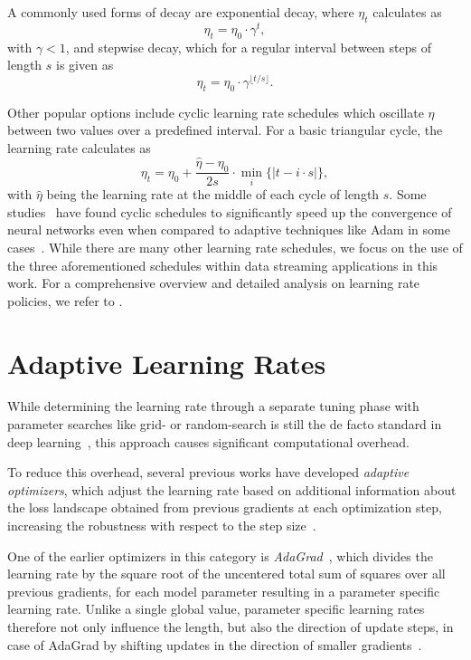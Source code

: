\documentclass[letterpaper]{article} %
\begin{document}
A commonly used forms of decay are exponential decay, where $\eta_{t}$ calculates as
\begin{equation}
	\eta_{t} = \eta_0 \cdot \gamma^t,
\end{equation}
with $\gamma < 1$, and stepwise decay, which for a regular interval between steps of length $s$ is given as
\begin{equation}
	\eta_{t} = \eta_0 \cdot \gamma^{\lfloor t/s \rfloor}.
\end{equation}

Other popular options include cyclic learning rate schedules which oscillate $\eta$ between two values over a predefined interval.
For a basic triangular cycle, the learning rate calculates as
\begin{equation}
	\eta_t = \eta_0 + \frac{\hat{\eta} - \eta_0}{2s} \cdot \min_{i} \{|t-i\cdot s|\},
\end{equation}
with $\hat{\eta}$ being the learning rate at the middle of each cycle of length $s$.
Some studies~\cite{smithCyclicalLearningRates2017, smithSuperConvergenceVeryFast2018a} have found cyclic schedules to significantly speed up the convergence of neural networks even when compared to adaptive techniques like Adam in some cases~\cite{kingmaAdamMethodStochastic2017b}.
While there are many other learning rate schedules, we focus on the use of the three aforementioned schedules within data streaming applications in this work.
For a comprehensive overview and detailed analysis on learning rate policies, we refer to \citet{wuDemystifyingLearningRate2019b}.

\section{Adaptive Learning Rates}

While determining the learning rate through a separate tuning phase with parameter searches like grid- or random-search is still the de facto standard in deep learning~\cite{defazioLearningRateFreeLearningDAdaptation2023a}, this approach causes significant computational overhead.

To reduce this overhead, several previous works have developed \textit{adaptive optimizers}, which adjust the learning rate based on additional information about the loss landscape obtained from previous gradients at each optimization step, increasing the robustness with respect to the step size~\cite{duchiAdaptiveSubgradientMethods2011}.

One of the earlier optimizers in this category is \textit{AdaGrad}~\cite{duchiAdaptiveSubgradientMethods2011}, which divides the learning rate by the square root of the uncentered total sum of squares over all previous gradients, for each model parameter resulting in a parameter specific learning rate.
Unlike a single global value, parameter specific learning rates therefore not only influence the length, but also the direction of update steps, in case of AdaGrad by shifting updates in the direction of smaller gradients~\cite{wuWNGradLearnLearning2020}. %
\end{document}
